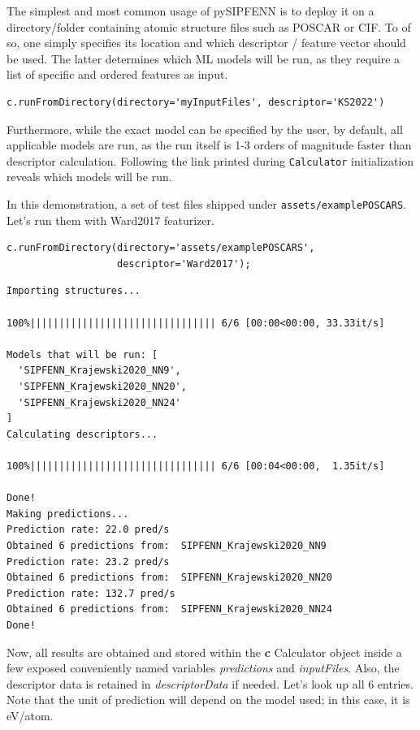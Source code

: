 The simplest and most common usage of pySIPFENN is to deploy it on a
directory/folder containing atomic structure files such as POSCAR or
CIF. To of so, one simply specifies its location and which descriptor /
feature vector should be used. The latter determines which ML models
will be run, as they require a list of specific and ordered features as
input.

\begin{verbatim}
c.runFromDirectory(directory='myInputFiles', descriptor='KS2022')
\end{verbatim}

Furthermore, while the exact model can be specified by the user, by
default, all applicable models are run, as the run itself is 1-3 orders
of magnitude faster than descriptor calculation. Following the link
printed during \texttt{Calculator} initialization
reveals which models will be run.

In this demonstration, a set of test files shipped under
\texttt{assets/examplePOSCARS}. Let's run them with
Ward2017 featurizer.

\begin{verbatim}
c.runFromDirectory(directory='assets/examplePOSCARS',
                   descriptor='Ward2017');
\end{verbatim}

\begin{verbatim}
Importing structures...

100%|||||||||||||||||||||||||||||||| 6/6 [00:00<00:00, 33.33it/s]

Models that will be run: [
  'SIPFENN_Krajewski2020_NN9', 
  'SIPFENN_Krajewski2020_NN20', 
  'SIPFENN_Krajewski2020_NN24'
]
Calculating descriptors...

100%|||||||||||||||||||||||||||||||| 6/6 [00:04<00:00,  1.35it/s]

Done!
Making predictions...
Prediction rate: 22.0 pred/s
Obtained 6 predictions from:  SIPFENN_Krajewski2020_NN9
Prediction rate: 23.2 pred/s
Obtained 6 predictions from:  SIPFENN_Krajewski2020_NN20
Prediction rate: 132.7 pred/s
Obtained 6 predictions from:  SIPFENN_Krajewski2020_NN24
Done!
\end{verbatim}

Now, all results are obtained and stored within the \textbf{c}
Calculator object inside a few exposed conveniently named variables
\emph{predictions} and \emph{inputFiles}. Also, the descriptor data is
retained in \emph{descriptorData} if needed. Let's look up all 6
entries. Note that the unit of prediction will depend on the model used;
in this case, it is eV/atom.


